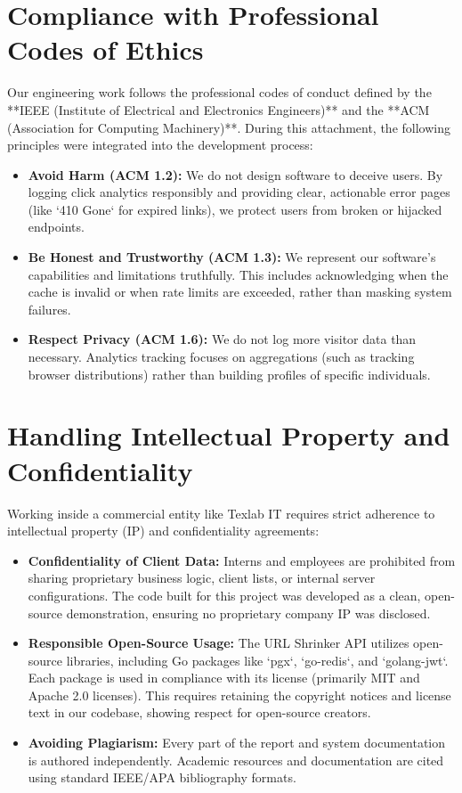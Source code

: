 \section{Compliance with Professional Codes of Ethics}
Our engineering work follows the professional codes of conduct defined by the **IEEE (Institute of Electrical and Electronics Engineers)** and the **ACM (Association for Computing Machinery)**. During this attachment, the following principles were integrated into the development process:
\begin{itemize}
    \item \textbf{Avoid Harm (ACM 1.2):} We do not design software to deceive users. By logging click analytics responsibly and providing clear, actionable error pages (like `410 Gone` for expired links), we protect users from broken or hijacked endpoints.
    \item \textbf{Be Honest and Trustworthy (ACM 1.3):} We represent our software's capabilities and limitations truthfully. This includes acknowledging when the cache is invalid or when rate limits are exceeded, rather than masking system failures.
    \item \textbf{Respect Privacy (ACM 1.6):} We do not log more visitor data than necessary. Analytics tracking focuses on aggregations (such as tracking browser distributions) rather than building profiles of specific individuals.
\end{itemize}

\section{Handling Intellectual Property and Confidentiality}
Working inside a commercial entity like Texlab IT requires strict adherence to intellectual property (IP) and confidentiality agreements:
\begin{itemize}
    \item \textbf{Confidentiality of Client Data:} Interns and employees are prohibited from sharing proprietary business logic, client lists, or internal server configurations. The code built for this project was developed as a clean, open-source demonstration, ensuring no proprietary company IP was disclosed.
    \item \textbf{Responsible Open-Source Usage:} The URL Shrinker API utilizes open-source libraries, including Go packages like `pgx`, `go-redis`, and `golang-jwt`. Each package is used in compliance with its license (primarily MIT and Apache 2.0 licenses). This requires retaining the copyright notices and license text in our codebase, showing respect for open-source creators.
    \item \textbf{Avoiding Plagiarism:} Every part of the report and system documentation is authored independently. Academic resources and documentation are cited using standard IEEE/APA bibliography formats.
\end{itemize}

